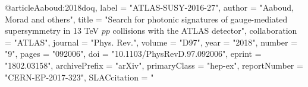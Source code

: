 @article{Aaboud:2018doq,
      label          = "ATLAS-SUSY-2016-27",
      author         = "Aaboud, Morad and others",
      title          = "{Search for photonic signatures of gauge-mediated
                        supersymmetry in 13 TeV $pp$ collisions with the ATLAS
                        detector}",
      collaboration  = "ATLAS",
      journal        = "Phys. Rev.",
      volume         = "D97",
      year           = "2018",
      number         = "9",
      pages          = "092006",
      doi            = "10.1103/PhysRevD.97.092006",
      eprint         = "1802.03158",
      archivePrefix  = "arXiv",
      primaryClass   = "hep-ex",
      reportNumber   = "CERN-EP-2017-323",
      SLACcitation   = "%
}

